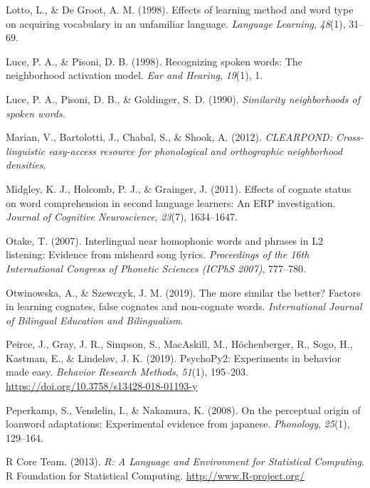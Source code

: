 \documentclass[
]{article}
\newlength{\cslhangindent}
\newenvironment{CSLReferences}[2] %
 {\begin{list}{}{%
  \setlength{\itemindent}{0pt}
  \setlength{\leftmargin}{0pt}
  \setlength{\parsep}{0pt}
  \ifodd #1
   \setlength{\leftmargin}{\cslhangindent}
   \setlength{\itemindent}{-1\cslhangindent}
  \fi
  \setlength{\itemsep}{#2\baselineskip}}}
 {\end{list}}
\begin{document}
\begin{CSLReferences}{1}{0}
Lotto, L., \& De Groot, A. M. (1998). Effects of learning method and
word type on acquiring vocabulary in an unfamiliar language.
\emph{Language Learning}, \emph{48}(1), 31--69.

Luce, P. A., \& Pisoni, D. B. (1998). Recognizing spoken words: {The}
neighborhood activation model. \emph{Ear and Hearing}, \emph{19}(1), 1.

Luce, P. A., Pisoni, D. B., \& Goldinger, S. D. (1990). \emph{Similarity
neighborhoods of spoken words.}

Marian, V., Bartolotti, J., Chabal, S., \& Shook, A. (2012).
\emph{{CLEARPOND}: {Cross-linguistic} easy-access resource for
phonological and orthographic neighborhood densities}.

Midgley, K. J., Holcomb, P. J., \& Grainger, J. (2011). Effects of
cognate status on word comprehension in second language learners: {An
ERP} investigation. \emph{Journal of Cognitive Neuroscience},
\emph{23}(7), 1634--1647.

Otake, T. (2007). Interlingual near homophonic words and phrases in L2
listening: Evidence from misheard song lyrics. \emph{Proceedings of the
16th International Congress of Phonetic Sciences (ICPhS 2007)},
777--780.

Otwinowska, A., \& Szewczyk, J. M. (2019). The more similar the better?
Factors in learning cognates, false cognates and non-cognate words.
\emph{International Journal of Bilingual Education and Bilingualism}.

Peirce, J., Gray, J. R., Simpson, S., MacAskill, M., Höchenberger, R.,
Sogo, H., Kastman, E., \& Lindeløv, J. K. (2019). {PsychoPy2}:
{Experiments} in behavior made easy. \emph{Behavior Research Methods},
\emph{51}(1), 195--203. \url{https://doi.org/10.3758/s13428-018-01193-y}

Peperkamp, S., Vendelin, I., \& Nakamura, K. (2008). On the perceptual
origin of loanword adaptations: Experimental evidence from japanese.
\emph{Phonology}, \emph{25}(1), 129--164.

R Core Team. (2013). \emph{R: {A Language} and {Environment} for
{Statistical Computing}}. R Foundation for Statistical Computing.
\url{http://www.R-project.org/}


\end{CSLReferences}
\end{document}
